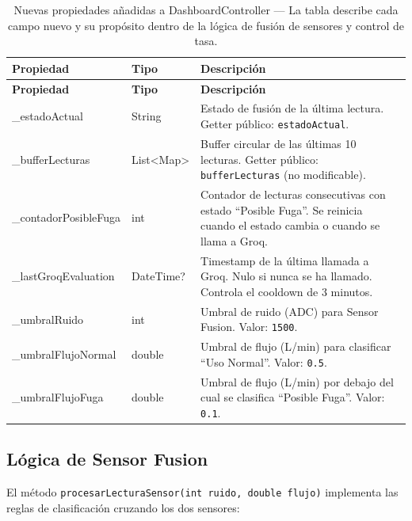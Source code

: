 \documentclass[12pt,a4paper]{article}
\begin{document}
\begin{longtable}{>{\ttfamily}p{5cm} p{2.5cm} p{6cm}}
\caption{Nuevas propiedades añadidas a DashboardController --- La tabla describe cada
  campo nuevo y su propósito dentro de la lógica de fusión de sensores y control de tasa.}
\label{tab:props-dashboard} \\
\toprule
\textbf{Propiedad} & \textbf{Tipo} & \textbf{Descripción} \\
\midrule
\endfirsthead
\toprule
\textbf{Propiedad} & \textbf{Tipo} & \textbf{Descripción} \\
\midrule
\endhead
\bottomrule
\endlastfoot
\_estadoActual & String & Estado de fusión de la última lectura. Getter público:
  \texttt{estadoActual}. \\[0.5em]
\_bufferLecturas & List\textless{}Map\textgreater & Buffer circular de las últimas
  10 lecturas. Getter público: \texttt{bufferLecturas} (no modificable). \\[0.5em]
\_contadorPosibleFuga & int & Contador de lecturas consecutivas con estado
  ``Posible Fuga''. Se reinicia cuando el estado cambia o cuando se llama a Groq. \\[0.5em]
\_lastGroqEvaluation & DateTime? & Timestamp de la última llamada a Groq. Nulo si
  nunca se ha llamado. Controla el cooldown de 3 minutos. \\[0.5em]
\_umbralRuido & int & Umbral de ruido (ADC) para Sensor Fusion. Valor: \texttt{1500}. \\[0.5em]
\_umbralFlujoNormal & double & Umbral de flujo (L/min) para clasificar ``Uso Normal''.
  Valor: \texttt{0.5}. \\[0.5em]
\_umbralFlujoFuga & double & Umbral de flujo (L/min) por debajo del cual se clasifica
  ``Posible Fuga''. Valor: \texttt{0.1}. \\
\end{longtable}

\subsection{Lógica de Sensor Fusion}

El método \texttt{procesarLecturaSensor(int ruido, double flujo)} implementa las reglas
de clasificación cruzando los dos sensores:
\end{document}
